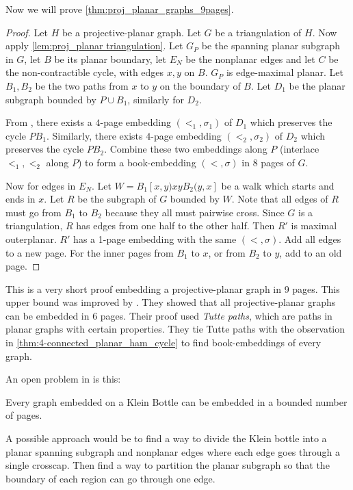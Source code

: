 Now we will prove \cref{thm:proj_planar_graphs_9pages}.
\begin{proof}
    Let $H$ be a projective-planar graph. Let $G$ be a triangulation of $H$.
    Now apply \cref{lem:proj_planar triangulation}. Let $G_P$ be the spanning planar subgraph in $G$, let $B$ be its planar boundary, let $E_N$ be the nonplanar edges and let $C$ be the non-contractible cycle, with edges $x, y$ on $B$. $G_P$ is edge-maximal planar. Let $B_1, B_2$ be the two paths from $x$ to $y$ on the boundary of $B$. Let $D_1$ be the planar subgraph bounded by $P \cup B_1$, similarly for $D_2$. 

    From \textcite{yannakakisEmbeddingPlanarGraphs1989}, there exists a $4$-page embedding $(<_1, \sigma_1)$ of $D_1$ which preserves the cycle $P B_1$. Similarly, there exists $4$-page embedding $(<_2, \sigma_2)$ of $D_2$ which preserves the cycle $P B_2$. Combine these two embeddings along $P$ (interlace $<_1, <_2$ along $P$) to form a book-embedding $(<, \sigma)$ in $8$ pages of $G$. 

    Now for edges in $E_N$. Let $W = B_1[x, y) xy B_2(y, x]$ be a walk which starts and ends in $x$. Let $R$ be the subgraph of $G$ bounded by $W$. Note that all edges of $R$ must go from $B_1$ to $B_2$ because they all must pairwise cross. Since $G$ is a triangulation, $R$ has edges from one half to the other half. Then $R'$ is maximal outerplanar. $R'$ has a 1-page embedding with the same $(<, \sigma)$. Add all edges to a new page. For the inner pages from $B_1$ to $x$, or from $B_2$ to $y$, add to an old page. 
\end{proof}

This is a very short proof embedding a projective-planar graph in 9 pages. This upper bound was improved by \textcite{ozekiBookEmbeddingGraphs2019}. They showed that all projective-planar graphs can be embedded in 6 pages. Their proof used \textit{Tutte paths}, which are paths in planar graphs with certain properties. They tie Tutte paths with the observation in \cref{thm:4-connected_planar_ham_cycle} to find book-embeddings of every graph.  

An open problem in \textcite{ozekiBookEmbeddingGraphs2019} is this:
\begin{conjecture}
    Every graph embedded on a Klein Bottle can be embedded in a bounded number of pages.
\end{conjecture}

A possible approach would be to find a way to divide the Klein bottle into a planar spanning subgraph and nonplanar edges where each edge goes through a single crosscap. Then find a way to partition the planar subgraph so that the boundary of each region can go through one edge. 